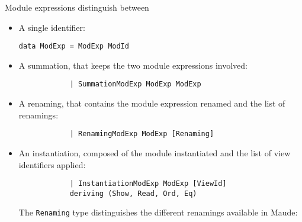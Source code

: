 Module expressions distinguish between

\begin{itemize}
\item A single identifier:

{\codesize
\begin{verbatim}
data ModExp = ModExp ModId
\end{verbatim}
}

\item A summation, that keeps the two module
expressions involved:

{\codesize
\begin{verbatim}
            | SummationModExp ModExp ModExp
\end{verbatim}
}

\item A renaming, that contains the module expression renamed
and the list of renamings:

{\codesize
\begin{verbatim}
            | RenamingModExp ModExp [Renaming]
\end{verbatim}
}

\item An instantiation, composed of the module instantiated
and the list of view identifiers applied:

{\codesize
\begin{verbatim}
            | InstantiationModExp ModExp [ViewId]
            deriving (Show, Read, Ord, Eq)
\end{verbatim}
}

The \verb"Renaming" type distinguishes the different renamings
available in Maude:

\end{itemize}


